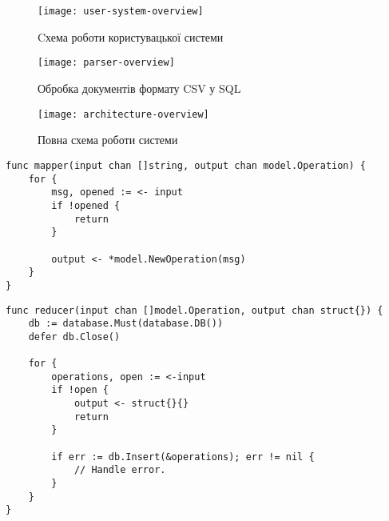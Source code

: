 \chapter{}

\begin{figure}[h]
\centering
\texttt{[image: user-system-overview]}
\caption{Cхема роботи користувацької системи}
\label{fig:user-system-overview}
\end{figure}

\begin{figure}[h]
\centering
\texttt{[image: parser-overview]}
\caption{Обробка документів формату CSV у SQL}
\label{fig:parser-overview}
\end{figure}

\begin{figure}[h]
\centering
\texttt{[image: architecture-overview]}
\caption{Повна схема роботи системи}
\label{fig:architecture-overview}
\end{figure}

\pagebreak

\begin{lstlisting}[caption={Реалізація функції Map.},captionpos=b]
func mapper(input chan []string, output chan model.Operation) {
	for {
		msg, opened := <- input
		if !opened {
			return
		}

		output <- *model.NewOperation(msg)
	}
}
\end{lstlisting}

\begin{lstlisting}[caption={Реалізація функції Reduce.},captionpos=b]
func reducer(input chan []model.Operation, output chan struct{}) {
	db := database.Must(database.DB())
	defer db.Close()

	for {
		operations, open := <-input
		if !open {
			output <- struct{}{}
			return
		}

		if err := db.Insert(&operations); err != nil {
			// Handle error.
		}
	}
}
\end{lstlisting}
